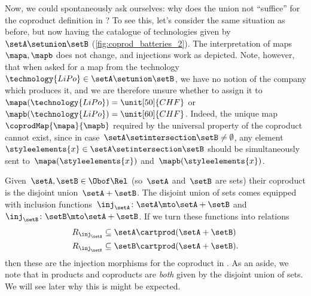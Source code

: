 \begin{example}
	Now, we could spontaneously ask ourselves: why does the union not ``suffice'' for the coproduct definition in \Set?
	To see this, let's consider the same situation as before, but now having the catalogue of technologies given by~$\setA\setunion \setB$ (\cref{fig:coprod_batteries_2}).
	The interpretation of maps~$\mapa,\mapb$ does not change, and injections work as depicted.
	Note, however, that when asked for a map from the technology~$\technology{LiPo}\in \setA\setunion \setB$, we have no notion of the company which produces it, and we are therefore unsure whether to assign it to~$\mapa(\technology{LiPo})=\unit[50]{CHF}$ or~$\mapb(\technology{LiPo})=\unit[60]{CHF}$.
	Indeed, the unique map~$\coprodMap{\mapa}{\mapb}$ required by the universal property of the coproduct cannot exist, since in case~$\setA\setintersection \setB\neq \emptyset$, any element~$\styleelements{x}\in \setA\setintersection \setB$ should be simultaneously sent to~$\mapa(\styleelements{x})$ and~$\mapb(\styleelements{x})$.

\end{example}


\begin{example}
	Given~$\setA,\setB\in \Obof\Rel$ (so~$\setA$ and~$\setB$ are sets) their coproduct is the disjoint union~$\setA+\setB$.
	The disjoint union of sets comes equipped with inclusion functions~$\inj_\setA\colon \setA\mto \setA+\setB$ and~$\inj_\setB\colon \setB\mto \setA+\setB$.
	If we turn these functions into relations
	\begin{equation*}
		\begin{aligned}
			R_{\inj_\setA} & \subseteq \setA\cartprod (\setA+\setB)  \\
			R_{\inj_\setB} & \subseteq \setB\cartprod (\setA+\setB).
		\end{aligned}
	\end{equation*}
	then these are the injection morphisms for the coproduct in \Rel.
	As an aside, we note that in \Rel products and coproducts are \emph{both} given by the disjoint union of sets.
	We will see later why this is might be expected.
\end{example}

